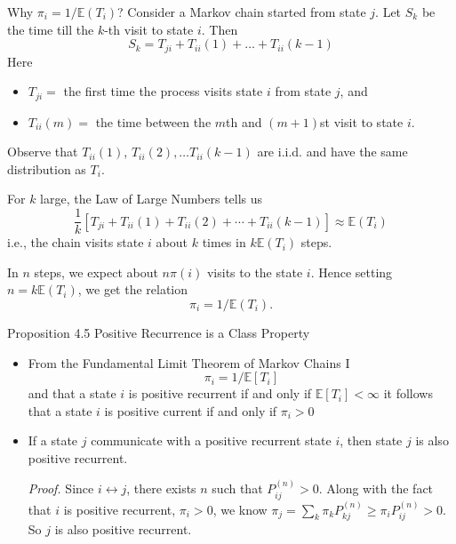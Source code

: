 \documentclass[letterpaper,handout, mathserif]{beamer}
\def\E{\mathbb E}
\def\X{\mathfrak{X}}
\begin{document}
\begin{frame}{Why $\pi_i=1/\E(T_i)$?}
Consider a Markov chain started from state $j$. Let $S_k$ be the time till the $k$-th visit to state $i$. Then
$$
S_k = T_{ji}+T_{ii}(1)+\ldots+T_{ii}(k-1)
$$
Here
\begin{itemize}
\item $T_{ji}=$ the first time the process visits state $i$ from state $j$, and
\item $T_{ii}(m)=$ the time between the $m$th and $(m+1)$st visit to state $i$.
\end{itemize}
Observe that $T_{ii}(1)$, $T_{ii}(2),\ldots T_{ii}(k-1)$ are i.i.d. and have the same distribution as $T_i.$

For $k$ large, the Law of Large Numbers tells us
$$
\frac{1}{k}[T_{ji}+T_{ii}(1)+T_{ii}(2)+\cdots+T_{ii}(k-1)]\approx\E(T_i)
$$
i.e., the chain visits state $i$ about $k$ times in $k\E(T_i)$ steps.

In $n$ steps, we expect about $n\pi(i)$ visits to the state $i$.
Hence setting $n = k\E (T_i)$, we get the relation $$\pi_i=1/\E(T_i).$$

\end{frame}
%
\begin{frame}{Proposition 4.5 Positive Recurrence is a Class Property}
\begin{itemize}
\item From the Fundamental Limit Theorem of Markov Chains I
\[\pi_i=1/\E[T_i]\]
and that a state $i$ is positive recurrent if and only if $\E[T_i]<\infty$
it follows that a state $i$ is positive current if and only if $\pi_i>0$

\item If a state $j$ communicate with a positive recurrent state $i$,
then state $j$ is also positive recurrent. \medskip

{\it Proof.} Since $i\leftrightarrow j$, there exists $n$ such that $P^{(n)}_{ij}>0$.
Along with the fact that $i$ is positive recurrent, $\pi_i > 0$, we know
$\pi_j = \sum_k \pi_k P^{(n)}_{kj} \ge \pi_i P^{(n)}_{ij} >0$.
So $j$ is also positive recurrent.
\end{itemize}
\end{frame}
\end{document}
